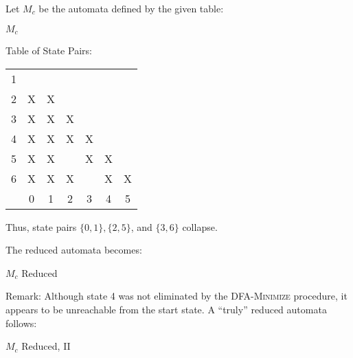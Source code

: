 Let $M_c$ be the automata defined by the given table:
\begin{automata}{$M_c$}
	
	
	
	
	
	
	
	
	
\end{automata}

Table of State Pairs: \\
\begin{center} \begin{tabular}{*{7}{c|}}
									\cline{1-2}
	1 &                       \\	\cline{1-3}
	2 & X & X                 \\	\cline{1-4}
	3 & X & X & X             \\	\cline{1-5}
	4 & X & X & X & X         \\	\cline{1-6}
	5 & X & X &   & X & X     \\	\hline
	6 & X & X & X &   & X & X \\	\hline
	  & 0 & 1 & 2 & 3 & 4 & 5 \\	\hline
\end{tabular} \end{center}

Thus, state pairs $\{0,1\}, \{2,5\}$, and $\{3,6\}$ collapse.

The reduced automata becomes:
\begin{automata}{$M_c$ Reduced}
	
	
	
	
	
\end{automata}

Remark: Although state 4 was not eliminated by the \textsc{DFA-Minimize} procedure, it appears to be unreachable from the start state. A ``truly'' reduced automata follows:

\begin{automata}{$M_c$ Reduced, II}
	
	
	
	
\end{automata}